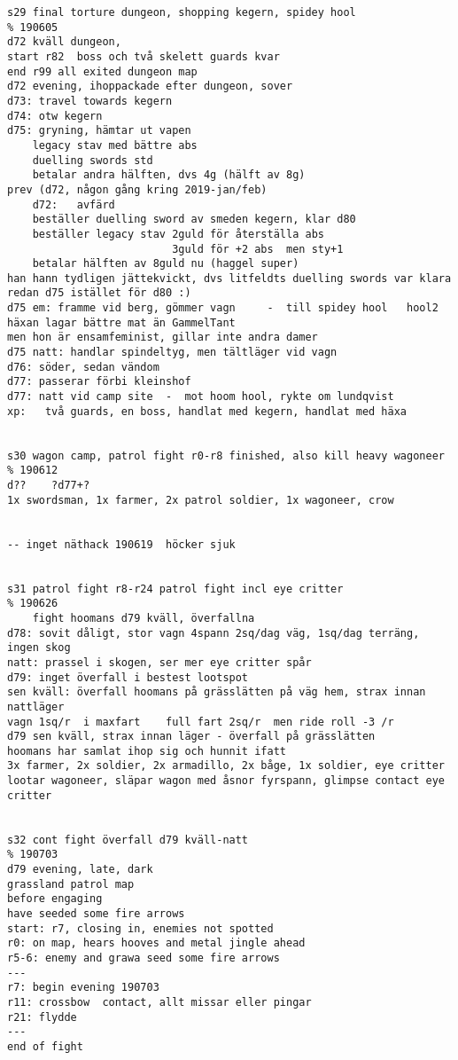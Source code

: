 \begin{verbatim}
s29 final torture dungeon, shopping kegern, spidey hool                 % 190605
d72 kväll dungeon, 
start r82  boss och två skelett guards kvar
end r99 all exited dungeon map
d72 evening, ihoppackade efter dungeon, sover
d73: travel towards kegern
d74: otw kegern
d75: gryning, hämtar ut vapen
    legacy stav med bättre abs
    duelling swords std
    betalar andra hälften, dvs 4g (hälft av 8g)
prev (d72, någon gång kring 2019-jan/feb)
    d72:   avfärd
    beställer duelling sword av smeden kegern, klar d80
    beställer legacy stav 2guld för återställa abs
                          3guld för +2 abs  men sty+1
    betalar hälften av 8guld nu (haggel super)
han hann tydligen jättekvickt, dvs litfeldts duelling swords var klara redan d75 istället för d80 :)
d75 em: framme vid berg, gömmer vagn     -  till spidey hool   hool2
häxan lagar bättre mat än GammelTant
men hon är ensamfeminist, gillar inte andra damer
d75 natt: handlar spindeltyg, men tältläger vid vagn
d76: söder, sedan vändom
d77: passerar förbi kleinshof
d77: natt vid camp site  -  mot hoom hool, rykte om lundqvist
xp:   två guards, en boss, handlat med kegern, handlat med häxa


s30 wagon camp, patrol fight r0-r8 finished, also kill heavy wagoneer   % 190612
d??    ?d77+?
1x swordsman, 1x farmer, 2x patrol soldier, 1x wagoneer, crow


-- inget näthack 190619  höcker sjuk


s31 patrol fight r8-r24 patrol fight incl eye critter                   % 190626
    fight hoomans d79 kväll, överfallna
d78: sovit dåligt, stor vagn 4spann 2sq/dag väg, 1sq/dag terräng, ingen skog
natt: prassel i skogen, ser mer eye critter spår
d79: inget överfall i bestest lootspot
sen kväll: överfall hoomans på grässlätten på väg hem, strax innan nattläger
vagn 1sq/r  i maxfart    full fart 2sq/r  men ride roll -3 /r
d79 sen kväll, strax innan läger - överfall på grässlätten
hoomans har samlat ihop sig och hunnit ifatt
3x farmer, 2x soldier, 2x armadillo, 2x båge, 1x soldier, eye critter
lootar wagoneer, släpar wagon med åsnor fyrspann, glimpse contact eye critter


s32 cont fight överfall d79 kväll-natt                                  % 190703
d79 evening, late, dark
grassland patrol map
before engaging
have seeded some fire arrows
start: r7, closing in, enemies not spotted
r0: on map, hears hooves and metal jingle ahead
r5-6: enemy and grawa seed some fire arrows
---
r7: begin evening 190703
r11: crossbow  contact, allt missar eller pingar
r21: flydde
--- 
end of fight



\end{verbatim}
